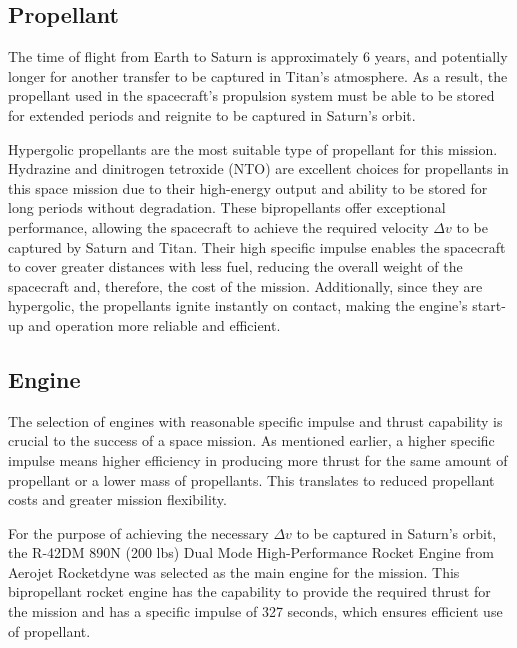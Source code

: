 \documentclass[conf]{new-aiaa}
\begin{document}
\subsection{Propellant}
\par The time of flight from Earth to Saturn is approximately 6 years, and potentially longer for another transfer to be captured in Titan's atmosphere. As a result, the propellant used in the spacecraft's propulsion system must be able to be stored for extended periods and reignite to be captured in Saturn's orbit.\\
\par Hypergolic propellants are the most suitable type of propellant for this mission. Hydrazine and dinitrogen tetroxide (NTO) are excellent choices for propellants in this space mission due to their high-energy output and ability to be stored for long periods without degradation. These bipropellants offer exceptional performance, allowing the spacecraft to achieve the required velocity $\Delta v$ to be captured by Saturn and Titan. Their high specific impulse enables the spacecraft to cover greater distances with less fuel, reducing the overall weight of the spacecraft and, therefore, the cost of the mission. Additionally, since they are hypergolic, the propellants ignite instantly on contact, making the engine's start-up and operation more reliable and efficient. \cite{braeunig_2008}
\subsection{Engine}
\par The selection of engines with reasonable specific impulse and thrust capability is crucial to the success of a space mission. As mentioned earlier, a higher specific impulse means higher efficiency in producing more thrust for the same amount of propellant or a lower mass of propellants. This translates to reduced propellant costs and greater mission flexibility.\\
\par For the purpose of achieving the necessary $\Delta v$ to be captured in Saturn's orbit, the R-42DM 890N (200 lbs) Dual Mode High-Performance Rocket Engine from Aerojet Rocketdyne was selected as the main engine for the mission. This bipropellant rocket engine has the capability to provide the required thrust for the mission and has a specific impulse of 327 seconds, which ensures efficient use of propellant. \cite{wilson_2020}\\
\end{document}
